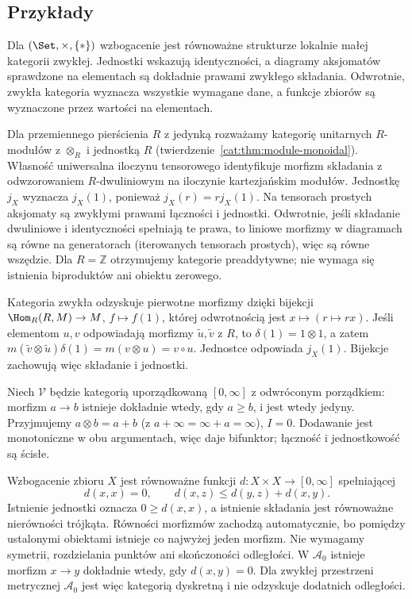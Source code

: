 \subsection{Przykłady}

\begin{przyklad}[Zbiory]\label{cat:ex:enriched-set}
Dla $(\Set,\times,\{*\})$ wzbogacenie jest równoważne strukturze lokalnie małej kategorii zwykłej. Jednostki wskazują identyczności, a diagramy aksjomatów sprawdzone na elementach są dokładnie prawami zwykłego składania. Odwrotnie, zwykła kategoria wyznacza wszystkie wymagane dane, a funkcje zbiorów są wyznaczone przez wartości na elementach.
\end{przyklad}

\begin{przyklad}\label{cat:ex:enriched-modules}
Dla przemiennego pierścienia $R$ z jedynką rozważamy kategorię unitarnych $R$-modułów z $\otimes_R$ i jednostką $R$ (twierdzenie~\ref{cat:thm:module-monoidal}). Własność uniwersalna iloczynu tensorowego identyfikuje morfizm składania z odwzorowaniem $R$-dwuliniowym na iloczynie kartezjańskim modułów. Jednostkę $j_X$ wyznacza $j_X(1)$, ponieważ $j_X(r)=rj_X(1)$. Na tensorach prostych aksjomaty są zwykłymi prawami łączności i jednostki. Odwrotnie, jeśli składanie dwuliniowe i identyczności spełniają te prawa, to liniowe morfizmy w diagramach są równe na generatorach (iterowanych tensorach prostych), więc są równe wszędzie. Dla $R=\mathbb Z$ otrzymujemy kategorie preaddytywne; nie wymaga się istnienia biproduktów ani obiektu zerowego.

Kategoria zwykła odzyskuje pierwotne morfizmy dzięki bijekcji $\Hom_R(R,M)\to M$, $f\mapsto f(1)$, której odwrotnością jest $x\mapsto(r\mapsto rx)$. Jeśli elementom $u,v$ odpowiadają morfizmy $\widetilde u,\widetilde v$ z $R$, to $\delta(1)=1\otimes1$, a zatem $m(\widetilde v\otimes\widetilde u)\delta(1)=m(v\otimes u)=v\circ u$. Jednostce odpowiada $j_X(1)$. Bijekcje zachowują więc składanie i jednostki.
\end{przyklad}

\begin{przyklad}\label{cat:ex:lawvere-metric}
Niech $\mathcal V$ będzie kategorią uporządkowaną $[0,\infty]$ z odwróconym porządkiem: morfizm $a\to b$ istnieje dokładnie wtedy, gdy $a\geq b$, i jest wtedy jedyny. Przyjmujemy $a\otimes b=a+b$ (z $a+\infty=\infty+a=\infty$), $I=0$. Dodawanie jest monotoniczne w obu argumentach, więc daje bifunktor; łączność i jednostkowość są ścisłe.

Wzbogacenie zbioru $X$ jest równoważne funkcji $d:X\times X\to[0,\infty]$ spełniającej
\[
 d(x,x)=0,\qquad d(x,z)\leq d(y,z)+d(x,y).
\]
Istnienie jednostki oznacza $0\geq d(x,x)$, a istnienie składania jest równoważne nierówności trójkąta. Równości morfizmów zachodzą automatycznie, bo pomiędzy ustalonymi obiektami istnieje co najwyżej jeden morfizm. Nie wymagamy symetrii, rozdzielania punktów ani skończoności odległości. W $\mathcal A_0$ istnieje morfizm $x\to y$ dokładnie wtedy, gdy $d(x,y)=0$. Dla zwykłej przestrzeni metrycznej $\mathcal A_0$ jest więc kategorią dyskretną i nie odzyskuje dodatnich odległości.
\end{przyklad}

